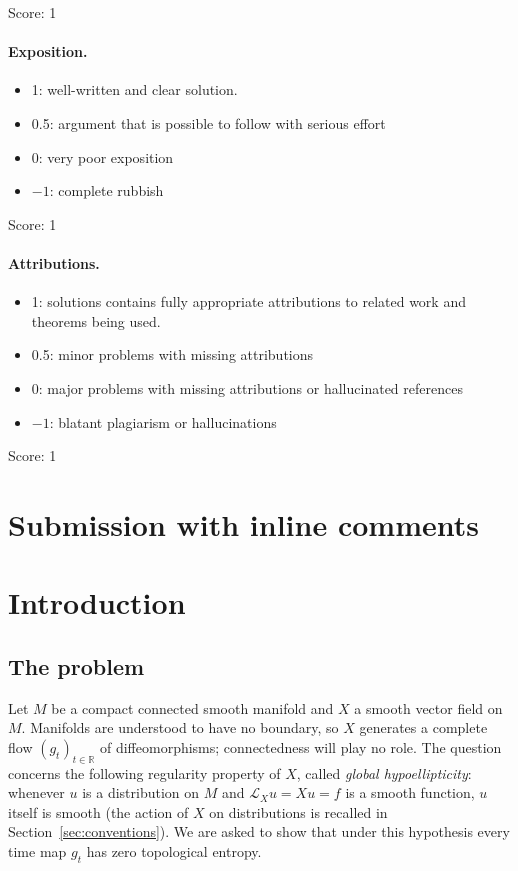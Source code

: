\documentclass[11pt]{article}
\theoremstyle{remark}
\newcommand{\R}{\mathbb R}
\newcommand{\LX}{\mathcal L_X}
\begin{document}
\noindent Score: 1

\paragraph{Exposition.}
\begin{itemize}
	\item  1: well-written and clear solution.
	\item  0.5: argument that is possible to follow with serious effort
	\item  0: very poor exposition
	\item  $-1$: complete rubbish
\end{itemize}

\noindent Score: 1

\paragraph{Attributions.}
\begin{itemize}
	\item  1: solutions contains fully appropriate attributions
		to related work and theorems being used.
	\item  0.5: minor problems with missing attributions
	\item  0: major problems with missing attributions or hallucinated
		 references
	\item  $-1$: blatant plagiarism or hallucinations
\end{itemize}

\noindent Score: 1

\newpage
\section{Submission with inline comments}


\section{Introduction}
\label{sec:intro}

\subsection{The problem}

Let \(M\) be a compact connected smooth manifold and \(X\) a smooth
vector field on \(M\).  Manifolds are understood to have no
boundary, so \(X\) generates a complete flow \((g_t)_{t\in\R}\) of
diffeomorphisms; connectedness will play no role.  The question concerns the following regularity
property of \(X\), called \emph{global hypoellipticity}: whenever
\(u\) is a distribution on \(M\) and \(\LX u=Xu=f\) is a smooth
function, \(u\) itself is smooth (the action of \(X\) on
distributions is recalled in Section~\ref{sec:conventions}).  We are
asked to show that under this hypothesis every time map \(g_t\) has
zero topological entropy.
\end{document}
